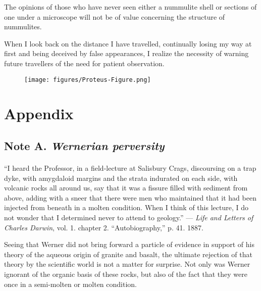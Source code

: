 \documentclass[a4paper, 12pt, oneside]{article}
\begin{document}
The opinions of those who have never seen either a nummulite shell or sections of one under a microscope will not be of value concerning the structure of nummulites.

When I look back on the distance I have travelled, continually losing my way at first and being deceived by false appearances, I realize the necessity of warning future travellers of the need for patient observation.
\begin{figure}[H]
\centering
\texttt{[image: figures/Proteus-Figure.png]}
\caption*{}
\end{figure}
\clearpage
\section{Appendix}
\subsection{Note A. \emph{Wernerian perversity}}
\paragraph{}
``I heard the Professor, in a field-lecture at Salisbury Crags, discoursing on a trap dyke, with amygdaloid margins and the strata indurated on each side, with volcanic rocks all around us, say that it was a fissure filled with sediment from above, adding with a sneer that there were men who maintained that it had been injected from beneath in a molten condition. When I think of this lecture, I do not wonder that I determined never to attend to geology.'' --- \emph{Life and Letters of Charles Darwin}, vol. 1. chapter 2. ``Autobiography,'' p. 41. 1887.

Seeing that Werner did not bring forward a particle of evidence in support of his theory of the aqueous origin of granite and basalt, the ultimate rejection of that theory by the scientific world is not a matter for surprise. Not only was Werner ignorant of the organic basis of these rocks, but also of the fact that they were once in a semi-molten or molten condition.
\end{document}

